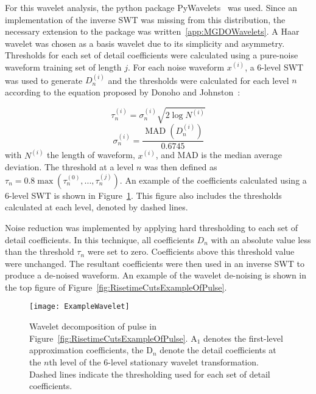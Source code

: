 	For this wavelet analysis, the python package PyWavelets~\cite{PyWave} was used.  Since an implementation of the inverse SWT was missing from this distribution, the necessary extension to the package was written~\ref{app:MGDOWavelets}.  A Haar wavelet was chosen as a basis wavelet due to its simplicity and asymmetry.  Thresholds for each set of detail coefficients were calculated using a pure-noise waveform training set of length $j$.  For each noise waveform $x^{(i)}$, a 6-level SWT was used to generate $D_{n}^{(i)}$ and the thresholds were calculated for each level $n$ according to the equation proposed by Donoho and Johnston~\cite{Don95ad}:
	
				\begin{equation}			
					\tau_{n}^{(i)} = \sigma_{n}^{(i)} \sqrt{2 \log N^{(i)}}
				\end{equation}			
				\[
					\sigma_{n}^{(i)} = \frac{\operatorname{MAD}\left(D_{n}^{(i)}\right)}{0.6745}
				\]
with $N^{(i)}$ the length of waveform, $x^{(i)}$, and MAD is the median average deviation.  The threshold at a level $n$ was then defined as $\tau_{n} = 0.8 \max(\tau_{n}^{(0)},...,\tau_{n}^{(j)})$.  An example of the coefficients calculated using a 6-level SWT is shown in Figure~\ref{fig:RisetimeCutsWaveletDecompositionOfPulse}.  This figure also includes the thresholds calculated at each level, denoted by dashed lines.  

Noise reduction was implemented by applying hard thresholding to each set of detail coefficients.  In this technique, all coefficients $D_{n}$ with an absolute value less than the threshold $\tau_{n}$ were set to zero.  Coefficients above this threshold value were unchanged.  The resultant coefficients were then used in an inverse SWT to produce a de-noised waveform.  An example of the wavelet de-noising is shown in the top figure of Figure~\ref{fig:RisetimeCutsExampleOfPulse}.
	
			
				\begin{figure}
					\centering
					\texttt{[image: ExampleWavelet]}
					\caption{Wavelet decomposition of pulse in Figure~\ref{fig:RisetimeCutsExampleOfPulse}.  A$_{1}$ denotes the first-level
					 approximation coefficients, the D$_{n}$ denote the detail coefficients at the $n$th level of the 6-level stationary wavelet 
					 transformation.  Dashed lines indicate the thresholding used for each set of detail coefficients.}
					\label{fig:RisetimeCutsWaveletDecompositionOfPulse}
				\end{figure}					

